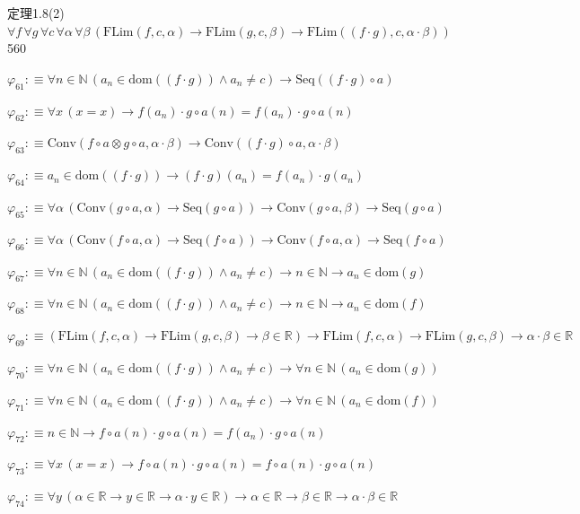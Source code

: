 \begin{fullproof}{定理1.8(2)}{$\forall f\,\forall g\,\forall c\,\forall \alpha\,\forall \beta\,(\mathrm{FLim}(f,c,\alpha) \to \mathrm{FLim}(g,c,\beta) \to \mathrm{FLim}((f \cdot g),c,\alpha \cdot \beta))$}{560}
\begin{abbrevlist}
\item $\varphi_{61} :\equiv \forall n \in \mathbb{N}\,(a_{n} \in \mathrm{dom}((f \cdot g)) \land a_{n} \neq c) \to \mathrm{Seq}((f \cdot g) \circ a)$
\item $\varphi_{62} :\equiv \forall x\,(x = x) \to f(a_{n}) \cdot g \circ a(n) = f(a_{n}) \cdot g \circ a(n)$
\item $\varphi_{63} :\equiv \mathrm{Conv}(f \circ a \otimes g \circ a,\alpha \cdot \beta) \to \mathrm{Conv}((f \cdot g) \circ a,\alpha \cdot \beta)$
\item $\varphi_{64} :\equiv a_{n} \in \mathrm{dom}((f \cdot g)) \to (f \cdot g)(a_{n}) = f(a_{n}) \cdot g(a_{n})$
\item $\varphi_{65} :\equiv \forall \alpha\,(\mathrm{Conv}(g \circ a,\alpha) \to \mathrm{Seq}(g \circ a)) \to \mathrm{Conv}(g \circ a,\beta) \to \mathrm{Seq}(g \circ a)$
\item $\varphi_{66} :\equiv \forall \alpha\,(\mathrm{Conv}(f \circ a,\alpha) \to \mathrm{Seq}(f \circ a)) \to \mathrm{Conv}(f \circ a,\alpha) \to \mathrm{Seq}(f \circ a)$
\item $\varphi_{67} :\equiv \forall n \in \mathbb{N}\,(a_{n} \in \mathrm{dom}((f \cdot g)) \land a_{n} \neq c) \to n \in \mathbb{N} \to a_{n} \in \mathrm{dom}(g)$
\item $\varphi_{68} :\equiv \forall n \in \mathbb{N}\,(a_{n} \in \mathrm{dom}((f \cdot g)) \land a_{n} \neq c) \to n \in \mathbb{N} \to a_{n} \in \mathrm{dom}(f)$
\item $\varphi_{69} :\equiv (\mathrm{FLim}(f,c,\alpha) \to \mathrm{FLim}(g,c,\beta) \to \beta \in \mathbb{R}) \to \mathrm{FLim}(f,c,\alpha) \to \mathrm{FLim}(g,c,\beta) \to \alpha \cdot \beta \in \mathbb{R}$
\item $\varphi_{70} :\equiv \forall n \in \mathbb{N}\,(a_{n} \in \mathrm{dom}((f \cdot g)) \land a_{n} \neq c) \to \forall n \in \mathbb{N}\,(a_{n} \in \mathrm{dom}(g))$
\item $\varphi_{71} :\equiv \forall n \in \mathbb{N}\,(a_{n} \in \mathrm{dom}((f \cdot g)) \land a_{n} \neq c) \to \forall n \in \mathbb{N}\,(a_{n} \in \mathrm{dom}(f))$
\item $\varphi_{72} :\equiv n \in \mathbb{N} \to f \circ a(n) \cdot g \circ a(n) = f(a_{n}) \cdot g \circ a(n)$
\item $\varphi_{73} :\equiv \forall x\,(x = x) \to f \circ a(n) \cdot g \circ a(n) = f \circ a(n) \cdot g \circ a(n)$
\item $\varphi_{74} :\equiv \forall y\,(\alpha \in \mathbb{R} \to y \in \mathbb{R} \to \alpha \cdot y \in \mathbb{R}) \to \alpha \in \mathbb{R} \to \beta \in \mathbb{R} \to \alpha \cdot \beta \in \mathbb{R}$

\end{abbrevlist}
\end{fullproof}
